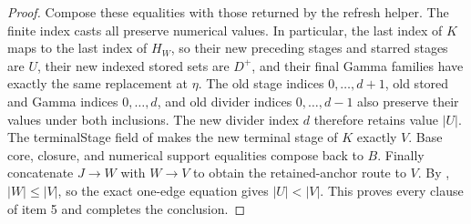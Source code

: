 \begin{proof}
Compose these equalities with those returned by the refresh helper.
The finite index casts all preserve numerical values. In particular,
the last index of $K$ maps to the last index of $H_W$, so their new
preceding stages and starred stages are $U$, their new indexed stored
sets are $D^+$, and their final Gamma families have exactly the same
replacement at $\eta$. The old stage indices $0,\ldots,d+1$,
old stored and Gamma indices $0,\ldots,d$, and old divider indices
$0,\ldots,d-1$ also preserve their values under both inclusions.
The new divider index $d$ therefore retains value $|U|$.
The terminalStage field of  makes the
new terminal stage of $K$ exactly $V$. Base core, closure, and
numerical support equalities compose back to $B$.
Finally concatenate $J\longrightarrow W$ with $W\longrightarrow V$
to obtain the retained-anchor route to $V$.
By ,
$|W|\leq|V|$, so the exact one-edge equation gives $|U|<|V|$.
This proves every clause of item 5 and completes the conclusion.
\end{proof}
